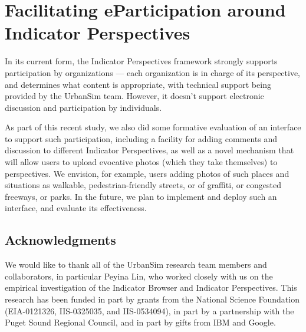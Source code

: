 \documentclass{acm_proc_article-sp}
\begin{document}
\section{Facilitating eParticipation around Indicator Perspectives}

In its current form, the Indicator Perspectives framework strongly supports
participation by organizations --- each organization is in charge of its
perspective, and determines what content is appropriate, with technical
support being provided by the UrbanSim team.  However, it doesn't support
electronic discussion and participation by individuals.  

As part of this recent study, we also did some formative evaluation of an
interface to support such participation, including a facility for adding
comments and discussion to different Indicator Perspectives, as well as a
novel mechanism that will allow users to upload evocative photos (which
they take themselves) to perspectives.  We envision, for example, users
adding photos of such places and situations as walkable,
pedestrian-friendly streets, or of graffiti, or congested freeways, or
parks.  In the future, we plan to implement and deploy such an interface,
and evaluate its effectiveness.

\subsection*{Acknowledgments}

We would like to thank all of the UrbanSim research team members and
collaborators, in particular Peyina Lin, who worked closely with us on the
empirical investigation of the Indicator Browser and Indicator
Perspectives.  This research has been funded in part by grants from the
National Science Foundation (EIA-0121326, IIS-0325035, and IIS-0534094), in
part by a partnership with the Puget Sound Regional Council, and in part by
gifts from IBM and Google.




\end{document}
